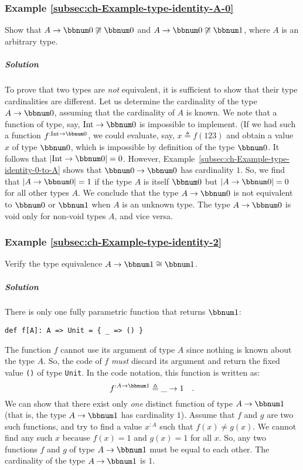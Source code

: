 \subsubsection{Example \label{subsec:ch-Example-type-identity-A-0}\ref{subsec:ch-Example-type-identity-A-0}}

Show that $A\rightarrow\bbnum 0\not\cong\bbnum 0$ and $A\rightarrow\bbnum 0\not\cong\bbnum 1$,
where $A$ is an arbitrary type.

\subparagraph{Solution}

To prove that two types are \emph{not} equivalent, it is sufficient
to show that their type cardinalities are different. Let us determine
the cardinality of the type $A\rightarrow\bbnum 0$, assuming that
the cardinality of $A$ is known. We note that a function of type,
say, $\text{Int}\rightarrow\bbnum 0$ is impossible to implement.
(If we had such a function $f^{:\text{Int}\rightarrow\bbnum 0}$,
we could evaluate, say, $x\triangleq f(123)$ and obtain a value $x$
of type $\bbnum 0$, which is impossible by definition of the type
$\bbnum 0$. It follows that $\left|\text{Int}\rightarrow\bbnum 0\right|=0$.
However, Example~\ref{subsec:ch-Example-type-identity-0-to-A} shows
that $\bbnum 0\rightarrow\bbnum 0$ has cardinality $1$. So, we find
that $\left|A\rightarrow\bbnum 0\right|=1$ if the type $A$ is itself
$\bbnum 0$ but $\left|A\rightarrow\bbnum 0\right|=0$ for all other
types $A$. We conclude that the type $A\rightarrow\bbnum 0$ is not
equivalent to $\bbnum 0$ or $\bbnum 1$ when $A$ is an unknown type.
The type $A\rightarrow\bbnum 0$ is void only for non-void types $A$,
and vice versa.

\subsubsection{Example \label{subsec:ch-Example-type-identity-2}\ref{subsec:ch-Example-type-identity-2}}

Verify the type equivalence $A\rightarrow\bbnum 1\cong\bbnum 1$.

\subparagraph{Solution}

There is only one fully parametric function that returns $\bbnum 1$:
\begin{lstlisting}
def f[A]: A => Unit = { _ => () }
\end{lstlisting}
The function $f$ cannot use its argument of type $A$ since nothing
is known about the type $A$. So, the code of $f$ \emph{must} discard
its argument and return the fixed value \lstinline!()! of type \lstinline!Unit!.
In the code notation, this function is written as:
\[
f^{:A\rightarrow\bbnum 1}\triangleq\_\rightarrow1\quad.
\]
We can show that there exist only \emph{one} distinct function of
type $A\rightarrow\bbnum 1$ (that is, the type $A\rightarrow\bbnum 1$
has cardinality $1$). Assume that $f$ and $g$ are two such functions,
and try to find a value $x^{:A}$ such that $f(x)\neq g(x)$. We cannot
find any such $x$ because $f(x)=1$ and $g(x)=1$ for all $x$. So,
any two functions $f$ and $g$ of type $A\rightarrow\bbnum 1$ must
be equal to each other. The cardinality of the type $A\rightarrow\bbnum 1$
is $1$.

